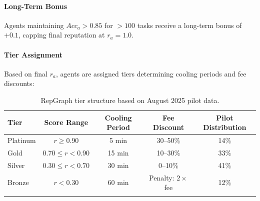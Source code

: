 \documentclass[11pt]{article}
\begin{document}
\paragraph{Long-Term Bonus} Agents maintaining $Acc_a > 0.85$ for $>100$ tasks receive a long-term bonus of $+0.1$, capping final reputation at $r_a = 1.0$.

\paragraph{Tier Assignment} Based on final $r_a$, agents are assigned tiers determining cooling periods and fee discounts:
\begin{longtable}{@{}lcccc@{}}
\toprule
\textbf{Tier} & \textbf{Score Range} & \textbf{Cooling Period} & \textbf{Fee Discount} & \textbf{Pilot Distribution} \\\midrule
Platinum & $r \geq 0.90$ & 5 min & 30--50\% & 14\% \\
Gold & $0.70 \leq r < 0.90$ & 15 min & 10--30\% & 33\% \\
Silver & $0.30 \leq r < 0.70$ & 30 min & 0--10\% & 41\% \\
Bronze & $r < 0.30$ & 60 min & Penalty: $2 \times$ fee & 12\% \\\bottomrule
\caption{RepGraph tier structure based on August 2025 pilot data.}
\label{tab:reputation-tiers}
\end{longtable}
\end{document}
